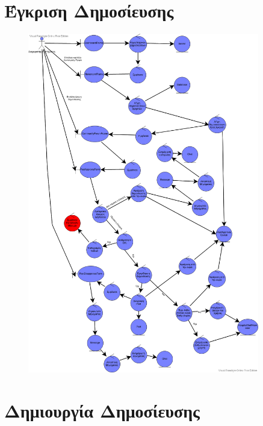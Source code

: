 \documentclass{article}
\begin{document}
\newpage

\section{Έγκριση Δημοσίευσης}

\vspace{0.2cm}

\begin{figure}[!htb]
        \centering
        \includegraphics[width=0.9\textwidth]{Admin Approval.png}
\end{figure}

\newpage

\section{Δημιουργία Δημοσίευσης}

\vspace{0.2cm}
\end{document}

